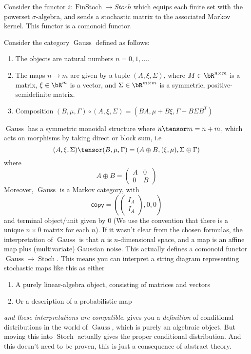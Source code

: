\documentclass{article}
\newcommand{\cop}{\mathsf{copy}}
\DeclareMathOperator{\Stoch}{Stoch}
\DeclareMathOperator{\Gauss}{Gauss}
\DeclareMathOperator{\FinStoch}{FinStoch}
\begin{document}
\begin{example}
    Consider the functor $i: \FinStoch \to Stoch$ which equips each finite set with the powerset $\sigma$-algebra, and sends a stochastic matrix to the associated Markov kernel.
    This functor is a comonoid functor.
\end{example}
\begin{example}
    Consider the category $\Gauss$ defined as follows:
    \begin{enumerate}
        \item The objects are natural numbers $n= 0, 1, \dots$.
        \item The maps $n \to m$ are given by a tuple $(A, \xi, \Sigma)$, where $M \in \bR^{n \times m}$ is a matrix, $\xi \in \bR^m$ is a vector, and $\Sigma \in \bR^{m \times m}$ is a symmetric, positive-semidefinite matrix.
        \item Composition $(B,\mu,\Gamma) \circ (A,\xi,\Sigma) = (BA, \mu + B\xi, \Gamma + B\Sigma B^T)$
    \end{enumerate}
    $\Gauss$ has a symmetric monoidal structure where $n \tensor m = n + m$, which acts on morphisms by taking direct or block sum, i.e
    \[(A,\xi,\Sigma) \tensor (B,\mu,\Gamma) = (A \oplus B, (\xi,\mu), \Sigma \oplus \Gamma)\]
where \[A \oplus B = \begin{pmatrix}A & 0 \\ 0 & B\end{pmatrix}\]
    Moreover, $\Gauss$ is a Markov category, with
\[\cop = \left(\begin{pmatrix}I_A\\I_A\end{pmatrix}, 0, 0\right)\]
    and terminal object/unit given by $0$ (We use the convention that there is a unique $n \times 0$ matrix for each $n$).
    If it wasn't clear from the chosen formulas, the interpretation of $\Gauss$ is that $n$ is $n$-dimensional space, and a map is an affine map plus (multivariate) Gaussian noise.
    This actually defines a comonoid functor $\Gauss \to \Stoch$.
    This means you can interpret a string diagram representing stochastic maps like this as either
    \begin{enumerate}
        \item A purely linear-algebra object, consisting of matrices and vectors
        \item Or a description of a probabilistic map
    \end{enumerate}
    \emph{and these interpretations are compatible}.
     gives you a \emph{definition} of conditional distributions in the world of $\Gauss$, which is purely an algebraic object.
    But moving this into $\Stoch$ actually gives the proper conditional distribution.
    And this doesn't need to be proven, this is just a consequence of abstract theory.

\end{example}
\end{document}
